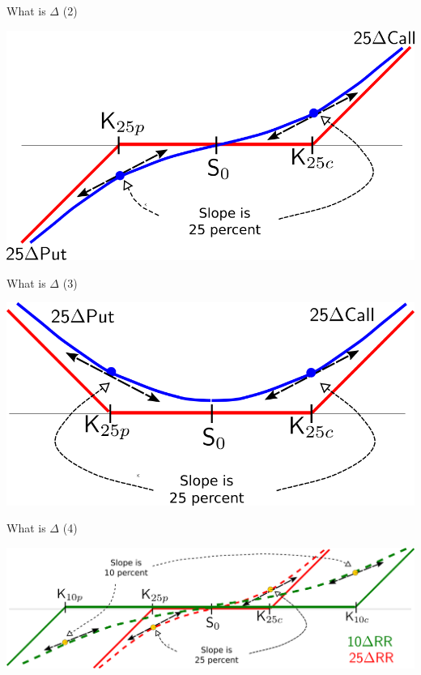 \documentclass[ignorenonframetext,aspectratio=169]{beamer}
\begin{document}
\begin{frame}{What is \(\Delta\) (2)}

\begin{center}\includegraphics[width=0.8\linewidth]{images/fig25RR} \end{center}

\end{frame}

\begin{frame}{What is \(\Delta\) (3)}

\begin{center}\includegraphics[width=0.8\linewidth]{images/fig25Strangle} \end{center}

\end{frame}

\begin{frame}{What is \(\Delta\) (4)}

\begin{center}\includegraphics[width=1\linewidth]{images/fig1025RR} \end{center}

\end{frame}
\end{document}
